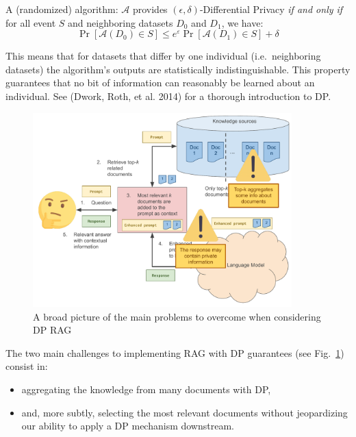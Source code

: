 \documentclass[
  12pt,
  a4paper,
]{article}
\providecommand{\tightlist}{%
  \setlength{\itemsep}{0pt}\setlength{\parskip}{0pt}}
\begin{document}
A (randomized) algorithm: \(\mathcal {A}\) provides
\((\epsilon,\delta)\)-Differential Privacy \emph{if and only if} for all
event \(S\) and neighboring datasets \(D_0\) and \(D_1\), we have:
\[\Pr[{\mathcal {A}}(D_{0})\in S]\leq e^{\varepsilon }\Pr[{\mathcal {A}}(D_{1})\in S]+\delta\]

This means that for datasets that differ by one individual
(i.e.~neighboring datasets) the algorithm's outputs are statistically
indistinguishable. This property guarantees that no bit of information
can reasonably be learned about an individual. See (Dwork, Roth, et al.
2014) for a thorough introduction to DP.

\begin{figure}
\centering
\includegraphics[width=100mm,height=\textheight,keepaspectratio]{figures/noDP-RAG-privacy.pdf}
\caption{A broad picture of the main problems to overcome when
considering DP RAG}\label{fig:ragpriv}
\end{figure}

The two main challenges to implementing RAG with DP guarantees (see
Fig.~\ref{fig:ragpriv}) consist in:

\begin{itemize}
\tightlist
\item
  aggregating the knowledge from many documents with DP,
\item
  and, more subtly, selecting the most relevant documents without
  jeopardizing our ability to apply a DP mechanism downstream.
\end{itemize}
\end{document}

